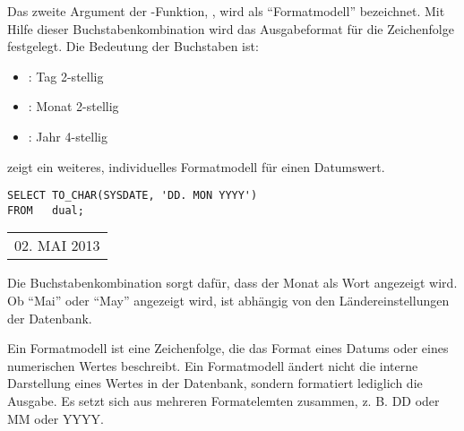           Das zweite Argument der -Funktion, , wird als \enquote{Formatmodell} bezeichnet. Mit Hilfe dieser Buchstabenkombination wird das Ausgabeformat f\"ur die Zeichenfolge festgelegt. Die Bedeutung der Buchstaben ist:
          \begin{itemize}
            \item {}: Tag 2-stellig
            \item {}: Monat 2-stellig
            \item {}: Jahr 4-stellig
          \end{itemize}
           zeigt ein weiteres, individuelles Formatmodell f\"ur einen Datumswert.
          \begin{lstlisting}[language=oracle_sql,caption={Ein anderes Formatmodell},label=sql03_30]
SELECT TO_CHAR(SYSDATE, 'DD. MON YYYY')
FROM   dual;
          \end{lstlisting}
          \begin{center}
            \begin{small}
              \tablehead{}

              \begin{oraclesql}
                \begin{supertabular}{l}
                  02. MAI 2013 \\
                \end{supertabular}
              \end{oraclesql}
            \end{small}
          \end{center}
          Die Buchstabenkombination  sorgt daf\"ur, dass der Monat als Wort angezeigt wird. Ob \enquote{Mai} oder \enquote{May} angezeigt wird, ist abh\"angig von den L\"andereinstellungen der Datenbank.
          \begin{merke}
            Ein Formatmodell ist eine Zeichenfolge, die das Format eines Datums oder eines numerischen Wertes beschreibt. Ein Formatmodell \"andert nicht die interne Darstellung eines Wertes in der Datenbank, sondern formatiert lediglich die Ausgabe. Es setzt sich aus mehreren Formatelemten zusammen, z. B. DD oder MM oder YYYY.
          \end{merke}
